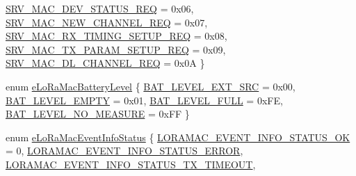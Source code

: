\begin{DoxyCompactItemize}
\newline
\hyperlink{group__LORAMAC_ggac91cc4dc69ad7de2426360f9f1f2d079ac98ae516df5419b24285a74da2d58d7f}{S\+R\+V\+\_\+\+M\+A\+C\+\_\+\+D\+E\+V\+\_\+\+S\+T\+A\+T\+U\+S\+\_\+\+R\+EQ} = 0x06, 
\hyperlink{group__LORAMAC_ggac91cc4dc69ad7de2426360f9f1f2d079a34e94bc23cacf1ab088ae1010e55efeb}{S\+R\+V\+\_\+\+M\+A\+C\+\_\+\+N\+E\+W\+\_\+\+C\+H\+A\+N\+N\+E\+L\+\_\+\+R\+EQ} = 0x07, 
\hyperlink{group__LORAMAC_ggac91cc4dc69ad7de2426360f9f1f2d079aa24b1505ef48247c1d2a3d486d603686}{S\+R\+V\+\_\+\+M\+A\+C\+\_\+\+R\+X\+\_\+\+T\+I\+M\+I\+N\+G\+\_\+\+S\+E\+T\+U\+P\+\_\+\+R\+EQ} = 0x08, 
\hyperlink{group__LORAMAC_ggac91cc4dc69ad7de2426360f9f1f2d079a6b15b371027770899224e613bbe162a8}{S\+R\+V\+\_\+\+M\+A\+C\+\_\+\+T\+X\+\_\+\+P\+A\+R\+A\+M\+\_\+\+S\+E\+T\+U\+P\+\_\+\+R\+EQ} = 0x09, 
\newline
\hyperlink{group__LORAMAC_ggac91cc4dc69ad7de2426360f9f1f2d079ae3385a6aa575b3ac756c362dbbc8c39f}{S\+R\+V\+\_\+\+M\+A\+C\+\_\+\+D\+L\+\_\+\+C\+H\+A\+N\+N\+E\+L\+\_\+\+R\+EQ} = 0x0A
 \}
\item 
enum \hyperlink{group__LORAMAC_gac7cbd1d9dc906cf2b33e3715cdd426c3}{e\+Lo\+Ra\+Mac\+Battery\+Level} \{ \hyperlink{group__LORAMAC_ggac7cbd1d9dc906cf2b33e3715cdd426c3ab2585bfe30f5bf5b5eee079ed2239cf4}{B\+A\+T\+\_\+\+L\+E\+V\+E\+L\+\_\+\+E\+X\+T\+\_\+\+S\+RC} = 0x00, 
\hyperlink{group__LORAMAC_ggac7cbd1d9dc906cf2b33e3715cdd426c3aa350120effa2360e583ad6e91704b067}{B\+A\+T\+\_\+\+L\+E\+V\+E\+L\+\_\+\+E\+M\+P\+TY} = 0x01, 
\hyperlink{group__LORAMAC_ggac7cbd1d9dc906cf2b33e3715cdd426c3a72005e8306adb99b1398ff2c6817e6b9}{B\+A\+T\+\_\+\+L\+E\+V\+E\+L\+\_\+\+F\+U\+LL} = 0x\+FE, 
\hyperlink{group__LORAMAC_ggac7cbd1d9dc906cf2b33e3715cdd426c3a74b9377d8f67a38ad73ce627ba610b55}{B\+A\+T\+\_\+\+L\+E\+V\+E\+L\+\_\+\+N\+O\+\_\+\+M\+E\+A\+S\+U\+RE} = 0x\+FF
 \}
\item 
enum \hyperlink{group__LORAMAC_ga3c4e7a774e25faf1606f577ee5e7d201}{e\+Lo\+Ra\+Mac\+Event\+Info\+Status} \{ \newline
\hyperlink{group__LORAMAC_gga3c4e7a774e25faf1606f577ee5e7d201aa5e3d1c382c8473a1095b56067aea3f4}{L\+O\+R\+A\+M\+A\+C\+\_\+\+E\+V\+E\+N\+T\+\_\+\+I\+N\+F\+O\+\_\+\+S\+T\+A\+T\+U\+S\+\_\+\+OK} = 0, 
\hyperlink{group__LORAMAC_gga3c4e7a774e25faf1606f577ee5e7d201a613ed77c0e8416a512224fffdbfdf6c1}{L\+O\+R\+A\+M\+A\+C\+\_\+\+E\+V\+E\+N\+T\+\_\+\+I\+N\+F\+O\+\_\+\+S\+T\+A\+T\+U\+S\+\_\+\+E\+R\+R\+OR}, 
\hyperlink{group__LORAMAC_gga3c4e7a774e25faf1606f577ee5e7d201a0c2eb197e4102e139b43c01e806fa538}{L\+O\+R\+A\+M\+A\+C\+\_\+\+E\+V\+E\+N\+T\+\_\+\+I\+N\+F\+O\+\_\+\+S\+T\+A\+T\+U\+S\+\_\+\+T\+X\+\_\+\+T\+I\+M\+E\+O\+UT}, 

\end{DoxyCompactItemize}
